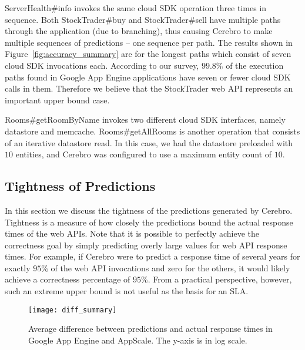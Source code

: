 ServerHealth\#info invokes the same cloud SDK operation three times in
sequence. Both StockTrader\#buy and StockTrader\#sell have multiple paths
through the application 
(due to branching), thus causing Cerebro to make multiple
sequences of predictions -- one sequence per path. The results shown in
Figure~\ref{fig:accuracy_summary} are for the longest paths which consist of
seven cloud SDK invocations each. According to our survey, $99.8\%$ of the
execution paths found in Google App Engine applications have seven or 
fewer cloud SDK
calls in them. Therefore we believe that the StockTrader web API
represents an important upper bound case. 

Rooms\#getRoomByName
invokes two different cloud SDK interfaces, namely datastore and memcache.
Rooms\#get\-AllRooms is another operation that consists of an iterative
datastore read. In this case, we had the datastore preloaded with $10$ entities,
and Cerebro was configured to use a maximum entity count of $10$. 

\subsection{Tightness of Predictions}

In this section we discuss the tightness of the predictions generated by Cerebro. 
Tightness is a measure of how closely the predictions
bound the actual response times of the web APIs. 
Note that it is possible to perfectly achieve the correctness goal
by simply predicting overly large values for web API response times. For example, if Cerebro were to
predict a response time of several years for exactly $95\%$ of the web API
invocations and zero for the others, it would likely
achieve a correctness percentage of $95\%$.  From a practical perspective,
however, such an extreme upper bound is not useful as the basis for an SLA. 

\begin{figure}
\centering
\texttt{[image: diff\_summary]}
\caption{Average difference between predictions and actual response times in
Google App Engine and AppScale. The y-axis is in log scale.}
\label{fig:diff_summary}
\vspace{-0.2in}
\end{figure}

